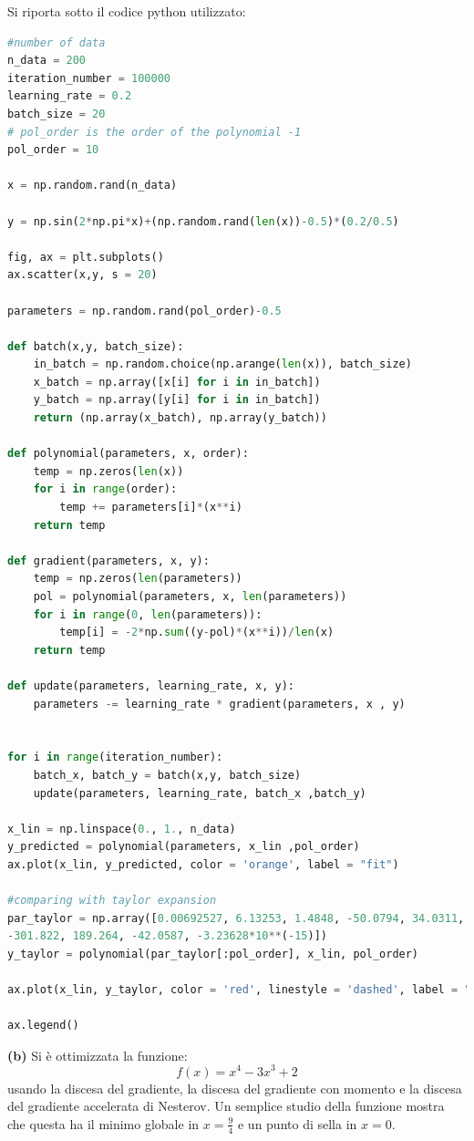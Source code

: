 \documentclass{article}
\begin{document}
Si riporta sotto il codice python utilizzato:
\begin{lstlisting}[language = python]
#number of data
n_data = 200
iteration_number = 100000
learning_rate = 0.2
batch_size = 20
# pol_order is the order of the polynomial -1
pol_order = 10

x = np.random.rand(n_data)

y = np.sin(2*np.pi*x)+(np.random.rand(len(x))-0.5)*(0.2/0.5)

fig, ax = plt.subplots()
ax.scatter(x,y, s = 20)

parameters = np.random.rand(pol_order)-0.5

def batch(x,y, batch_size):
    in_batch = np.random.choice(np.arange(len(x)), batch_size)
    x_batch = np.array([x[i] for i in in_batch])
    y_batch = np.array([y[i] for i in in_batch])
    return (np.array(x_batch), np.array(y_batch))

def polynomial(parameters, x, order):
    temp = np.zeros(len(x))
    for i in range(order):
        temp += parameters[i]*(x**i)
    return temp

def gradient(parameters, x, y):
    temp = np.zeros(len(parameters))
    pol = polynomial(parameters, x, len(parameters))
    for i in range(0, len(parameters)):
        temp[i] = -2*np.sum((y-pol)*(x**i))/len(x)
    return temp

def update(parameters, learning_rate, x, y):
    parameters -= learning_rate * gradient(parameters, x , y)


for i in range(iteration_number):
    batch_x, batch_y = batch(x,y, batch_size)
    update(parameters, learning_rate, batch_x ,batch_y)

x_lin = np.linspace(0., 1., n_data)
y_predicted = polynomial(parameters, x_lin ,pol_order)
ax.plot(x_lin, y_predicted, color = 'orange', label = "fit")

#comparing with taylor expansion
par_taylor = np.array([0.00692527, 6.13253, 1.4848, -50.0794, 34.0311, -10.1117, 173.146, \
-301.822, 189.264, -42.0587, -3.23628*10**(-15)])
y_taylor = polynomial(par_taylor[:pol_order], x_lin, pol_order)

ax.plot(x_lin, y_taylor, color = 'red', linestyle = 'dashed', label = "taylor expansion")

ax.legend()
\end{lstlisting}

\textbf{(b)} Si è ottimizzata la funzione:
\[
f(x) = x^4 - 3x^3 +2
\]
usando la discesa del gradiente, la discesa del gradiente con momento e la discesa del gradiente accelerata di Nesterov.
Un semplice studio della funzione mostra che questa ha il minimo globale in $x = \frac{9}{4}$ e un punto di sella in $x = 0$. 
\end{document}
